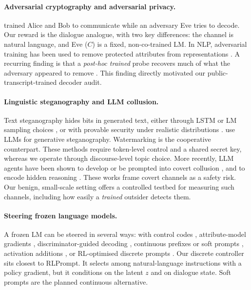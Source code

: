 \documentclass[10pt,a4paper,twocolumn]{article}
\newcommand{\1}{\mathbb{1}}
\begin{document}
\paragraph{Adversarial cryptography and adversarial privacy.}
\citet{abadi2016learning} trained Alice and Bob to communicate while an adversary Eve tries to decode. Our reward is the dialogue analogue, with two key differences: the channel is natural language, and Eve ($C$) is a fixed, non-co-trained LM. In NLP, adversarial training has been used to remove protected attributes from representations \citep{ganin2016domain,elazar2018adversarial,coavoux2018privacy}. A recurring finding is that a \emph{post-hoc trained} probe recovers much of what the adversary appeared to remove \citep{elazar2018adversarial}. This finding directly motivated our public-transcript-trained decoder audit.

\paragraph{Linguistic steganography and LLM collusion.}
Text steganography hides bits in generated text, either through LSTM or LM sampling choices \citep{fang2017generating,ziegler2019neural,dai2019towards}, or with provable security under realistic distributions \citep{kaptchuk2021meteor}. \citet{wu2024generative} use LLMs for generative steganography. Watermarking \citep{kirchenbauer2023watermark} is the cooperative counterpart. These methods require token-level control and a shared secret key, whereas we operate through discourse-level topic choice. More recently, LLM agents have been shown to develop or be prompted into covert collusion \citep{motwani2024secret,mathew2024hidden}, and to encode hidden reasoning \citep{roger2023preventing}. These works frame covert channels as a safety risk. Our benign, small-scale setting offers a controlled testbed for measuring such channels, including how easily a \emph{trained} outsider detects them.

\paragraph{Steering frozen language models.}
A frozen LM can be steered in several ways: with control codes \citep{keskar2019ctrl}, attribute-model gradients \citep{dathathri2020pplm}, discriminator-guided decoding \citep{krause2021gedi}, continuous prefixes or soft prompts \citep{li2021prefix,lester2021power}, activation additions \citep{turner2023activation}, or RL-optimised discrete prompts \citep{deng2022rlprompt}. Our discrete controller sits closest to RLPrompt. It selects among natural-language instructions with a policy gradient, but it conditions on the latent $z$ and on dialogue state. Soft prompts are the planned continuous alternative.
\end{document}
